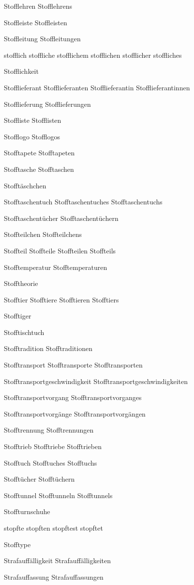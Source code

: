 Stofflehren
Stofflehrens

Stoffleiste
Stoffleisten

Stoffleitung
Stoffleitungen

stofflich
stoffliche
stofflichem
stofflichen
stofflicher
stoffliches

Stofflichkeit

Stofflieferant
Stofflieferanten
Stofflieferantin
Stofflieferantinnen

Stofflieferung
Stofflieferungen

Stoffliste
Stofflisten

Stofflogo
Stofflogos

Stofftapete
Stofftapeten

Stofftasche
Stofftaschen

Stofftäschchen

Stofftaschentuch
Stofftaschentuches
Stofftaschentuchs

Stofftaschentücher
Stofftaschentüchern

Stoffteilchen
Stoffteilchens

Stoffteil
Stoffteile
Stoffteilen
Stoffteils

Stofftemperatur
Stofftemperaturen

Stofftheorie

Stofftier
Stofftiere
Stofftieren
Stofftiers

Stofftiger

Stofftischtuch

Stofftradition
Stofftraditionen

Stofftransport
Stofftransporte
Stofftransporten

Stofftransportgeschwindigkeit
Stofftransportgeschwindigkeiten

Stofftransportvorgang
Stofftransportvorganges

Stofftransportvorgänge
Stofftransportvorgängen

Stofftrennung
Stofftrennungen

Stofftrieb
Stofftriebe
Stofftrieben

Stofftuch
Stofftuches
Stofftuchs

Stofftücher
Stofftüchern

Stofftunnel
Stofftunneln
Stofftunnels

Stoffturnschuhe

stopfte
stopften
stopftest
stopftet

Stofftype

Strafauffälligkeit
Strafauffälligkeiten

Strafauffassung
Strafauffassungen

